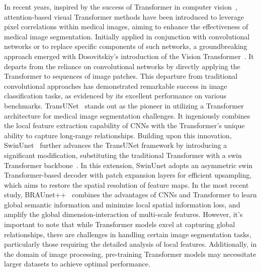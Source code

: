 \documentclass[review]{elsarticle}
\begin{document}
	In recent years, inspired by the success of Transformer in computer vision~\cite{vaswani2017attention,chen2021transunet,gu2020net,wang2021transbts}, attention-based visual Transformer methods have been introduced to leverage pixel correlations within medical images, aiming to enhance the effectiveness of medical image segmentation. Initially applied in conjunction with convolutional networks or to replace specific components of such networks, a groundbreaking approach emerged with Dosovitskiy's introduction of the Vision Transformer~\cite{dosovitskiy2020image}. It departs from the reliance on convolutional networks by directly applying the Transformer to sequences of image patches. This departure from traditional convolutional approaches has demonstrated remarkable success in image classification tasks, as evidenced by its excellent performance on various benchmarks. TransUNet~\cite{chen2021transunet} stands out as the pioneer in utilizing a Transformer architecture for medical image segmentation challenges. It ingeniously combines the local feature extraction capability of CNNs with the Transformer's unique ability to capture long-range relationships. Building upon this innovation, SwinUnet~\cite{cao2022swin} further advances the TransUNet framework by introducing a significant modification, substituting the traditional Transformer with a swin Transformer backbone~\cite{liu2021swin}. In this extension, SwinUnet adopts an asymmetric swin Transformer-based decoder with patch expansion layers for efficient upsampling, which aims to restore the spatial resolution of feature maps. In the most recent study, BRAUnet++~\cite{lan2024brau} combines the advantages of CNNs and Transformer to learn global semantic information and minimize local spatial information loss, and amplify the global dimension-interaction of multi-scale features. However, it's important to note that while Transformer models excel at capturing global relationships, there are challenges in handling certain image segmentation tasks, particularly those requiring the detailed analysis of local features. Additionally, in the domain of image processing, pre-training Transformer models may necessitate larger datasets to achieve optimal performance.
	
\end{document}
